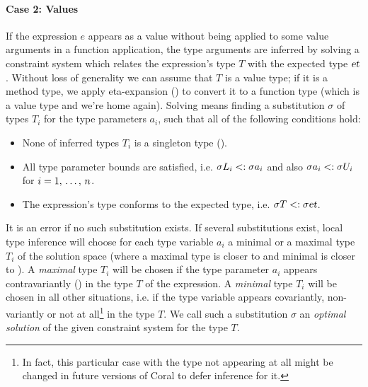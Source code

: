 \paragraph{Case 2: Values}
If the expression $e$ appears as a value without being applied to some value arguments in a function application, the type arguments are inferred by solving a constraint system which relates the expression's type $T$ with the expected type $\mbox{\sl et}$. Without loss of generality we can assume that $T$ is a value type; if it is a method type, we apply eta-expansion () to convert it to a function type (which is a value type and we're home again). Solving means finding a substitution $\sigma$ of types $T_i$ for the type parameters $a_i$, such that all of the following conditions hold:
\begin{itemize}
\item None of inferred types $T_i$ is a singleton type (). %
\item All type parameter bounds are satisfied, i.e. $\sigma L_i <: \sigma a_i$ and also $\sigma a_i <: \sigma U_i$ for $i = 1 ,\, \ldots ,\, n$. 
\item The expression's type conforms to the expected type, i.e. $\sigma T <: \sigma \mbox{\sl et}$. 
\end{itemize}

It is an error if no such substitution exists. If several substitutions exist, local type inference will choose for each type variable $a_i$ a minimal or a maximal type $T_i$ of the solution space (where a maximal type is closer to  and minimal is closer to ). A {\em maximal} type $T_i$ will be chosen if the type parameter $a_i$ appears contravariantly () in the type $T$ of the expression. A {\em minimal} type $T_i$ will be chosen in all other situations, i.e. if the type variable appears covariantly, non-variantly or not at all\footnote{In fact, this particular case with the type not appearing at all might be changed in future versions of Coral to defer inference for it.} in the type $T$. We call such a substitution $\sigma$ an {\em optimal solution} of the given constraint system for the type $T$. 

